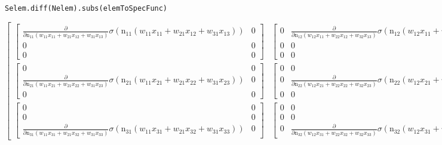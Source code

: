 \documentclass[
]{article}
\begin{document}
\begin{verbatim}
Selem.diff(Nelem).subs(elemToSpecFunc)
\end{verbatim}

\(\displaystyle \left[\begin{matrix}\left[\begin{matrix}\frac{\partial}{\partial \operatorname{n_{11}}{\left(w_{11} x_{11} + w_{21} x_{12} + w_{31} x_{13} \right)}} \sigma{\left(\operatorname{n_{11}}{\left(w_{11} x_{11} + w_{21} x_{12} + w_{31} x_{13} \right)} \right)} & 0\\0 & 0\\0 & 0\end{matrix}\right] & \left[\begin{matrix}0 & \frac{\partial}{\partial \operatorname{n_{12}}{\left(w_{12} x_{11} + w_{22} x_{12} + w_{32} x_{13} \right)}} \sigma{\left(\operatorname{n_{12}}{\left(w_{12} x_{11} + w_{22} x_{12} + w_{32} x_{13} \right)} \right)}\\0 & 0\\0 & 0\end{matrix}\right]\\\left[\begin{matrix}0 & 0\\\frac{\partial}{\partial \operatorname{n_{21}}{\left(w_{11} x_{21} + w_{21} x_{22} + w_{31} x_{23} \right)}} \sigma{\left(\operatorname{n_{21}}{\left(w_{11} x_{21} + w_{21} x_{22} + w_{31} x_{23} \right)} \right)} & 0\\0 & 0\end{matrix}\right] & \left[\begin{matrix}0 & 0\\0 & \frac{\partial}{\partial \operatorname{n_{22}}{\left(w_{12} x_{21} + w_{22} x_{22} + w_{32} x_{23} \right)}} \sigma{\left(\operatorname{n_{22}}{\left(w_{12} x_{21} + w_{22} x_{22} + w_{32} x_{23} \right)} \right)}\\0 & 0\end{matrix}\right]\\\left[\begin{matrix}0 & 0\\0 & 0\\\frac{\partial}{\partial \operatorname{n_{31}}{\left(w_{11} x_{31} + w_{21} x_{32} + w_{31} x_{33} \right)}} \sigma{\left(\operatorname{n_{31}}{\left(w_{11} x_{31} + w_{21} x_{32} + w_{31} x_{33} \right)} \right)} & 0\end{matrix}\right] & \left[\begin{matrix}0 & 0\\0 & 0\\0 & \frac{\partial}{\partial \operatorname{n_{32}}{\left(w_{12} x_{31} + w_{22} x_{32} + w_{32} x_{33} \right)}} \sigma{\left(\operatorname{n_{32}}{\left(w_{12} x_{31} + w_{22} x_{32} + w_{32} x_{33} \right)} \right)}\end{matrix}\right]\end{matrix}\right]\)
\end{document}
